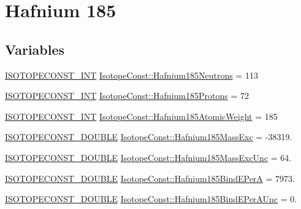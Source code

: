 \hypertarget{group___isotope_const-_hafnium-_hf185}{}\section{Hafnium 185}
\label{group___isotope_const-_hafnium-_hf185}
\subsection*{Variables}
\begin{DoxyCompactItemize}
\item 
\mbox{\hyperlink{group___isotope_const-_macros_ga5f18360b3e99483a35c32d789e62621c}{I\+S\+O\+T\+O\+P\+E\+C\+O\+N\+S\+T\+\_\+\+I\+NT}} \mbox{\hyperlink{group___isotope_const-_hafnium-_hf185_ga17926f1174b77939bb4e60e9013d98db}{Isotope\+Const\+::\+Hafnium185\+Neutrons}} = 113
\item 
\mbox{\hyperlink{group___isotope_const-_macros_ga5f18360b3e99483a35c32d789e62621c}{I\+S\+O\+T\+O\+P\+E\+C\+O\+N\+S\+T\+\_\+\+I\+NT}} \mbox{\hyperlink{group___isotope_const-_hafnium-_hf185_ga818c95d68eed61ea94824a995c6d6c0e}{Isotope\+Const\+::\+Hafnium185\+Protons}} = 72
\item 
\mbox{\hyperlink{group___isotope_const-_macros_ga5f18360b3e99483a35c32d789e62621c}{I\+S\+O\+T\+O\+P\+E\+C\+O\+N\+S\+T\+\_\+\+I\+NT}} \mbox{\hyperlink{group___isotope_const-_hafnium-_hf185_ga85bb08dce15efb7c131d4c05578f7ba7}{Isotope\+Const\+::\+Hafnium185\+Atomic\+Weight}} = 185
\item 
\mbox{\hyperlink{group___isotope_const-_macros_ga8f45a7272ce02c0b4c65c44636ed719a}{I\+S\+O\+T\+O\+P\+E\+C\+O\+N\+S\+T\+\_\+\+D\+O\+U\+B\+LE}} \mbox{\hyperlink{group___isotope_const-_hafnium-_hf185_gacd5eb6bf2c83c050183e9d1e4325cf31}{Isotope\+Const\+::\+Hafnium185\+Mass\+Exc}} = -\/38319.
\item 
\mbox{\hyperlink{group___isotope_const-_macros_ga8f45a7272ce02c0b4c65c44636ed719a}{I\+S\+O\+T\+O\+P\+E\+C\+O\+N\+S\+T\+\_\+\+D\+O\+U\+B\+LE}} \mbox{\hyperlink{group___isotope_const-_hafnium-_hf185_ga6865e23b572f473022e56107528b1a13}{Isotope\+Const\+::\+Hafnium185\+Mass\+Exc\+Unc}} = 64.
\item 
\mbox{\hyperlink{group___isotope_const-_macros_ga8f45a7272ce02c0b4c65c44636ed719a}{I\+S\+O\+T\+O\+P\+E\+C\+O\+N\+S\+T\+\_\+\+D\+O\+U\+B\+LE}} \mbox{\hyperlink{group___isotope_const-_hafnium-_hf185_gaab8ff78f1a33359de3ce2f26d202b3be}{Isotope\+Const\+::\+Hafnium185\+Bind\+E\+PerA}} = 7973.
\item 
\mbox{\hyperlink{group___isotope_const-_macros_ga8f45a7272ce02c0b4c65c44636ed719a}{I\+S\+O\+T\+O\+P\+E\+C\+O\+N\+S\+T\+\_\+\+D\+O\+U\+B\+LE}} \mbox{\hyperlink{group___isotope_const-_hafnium-_hf185_gae31439abd974ed6a8ee12f903bd1a91a}{Isotope\+Const\+::\+Hafnium185\+Bind\+E\+Per\+A\+Unc}} = 0.

\end{DoxyCompactItemize}
